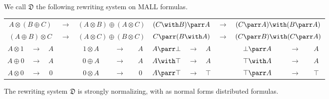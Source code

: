 \documentclass{lmcs}
\newcommand*{\tens}{\otimes} %
\newcommand*{\distsystem}{\mathfrak{D}}
\begin{document}
\begin{defi}
\label{def:distsystem}
We call $\distsystem$ the following rewriting system on MALL formulas.
\begin{center}
\begin{tabular}{cccc|cccc|cccc|cccc}
\multicolumn{3}{c}{$A\tens(B\oplus C)$} & \multicolumn{2}{c}{$\rightarrow$} & \multicolumn{3}{c|}{$(A\tens B)\oplus(A\tens C)$} & \multicolumn{3}{c}{$(C\with B)\parr A$} & \multicolumn{2}{c}{$\rightarrow$} & \multicolumn{3}{c}{$(C\parr A)\with(B\parr A)$} \\
\multicolumn{3}{c}{$(A\oplus B)\tens C$} & \multicolumn{2}{c}{$\rightarrow$} & \multicolumn{3}{c|}{$(A\tens C)\oplus(B\tens C)$} & \multicolumn{3}{c}{$C\parr(B\with A)$} & \multicolumn{2}{c}{$\rightarrow$} & \multicolumn{3}{c}{$(C\parr B)\with(C\parr A)$} \\\hline
$A\tens 1$ & $\rightarrow$ & $A$ & & & $1\tens A$ & $\rightarrow$ & $A$ & $A\parr\bot$ & $\rightarrow$ & $A$ & & & $\bot\parr A$ & $\rightarrow$ & $A$ \\
$A\oplus 0$ & $\rightarrow$ & $A$ & & & $0\oplus A$ & $\rightarrow$ & $A$ & $A\with\top$ & $\rightarrow$ & $A$ & & & $\top\with A$ & $\rightarrow$ & $A$ \\
$A\tens 0$ & $\rightarrow$ & $0$ & & & $0\tens A$ & $\rightarrow$ & $0$ & $A\parr \top$ & $\rightarrow$ & $\top$ & & & $\top\parr A$ & $\rightarrow$ & $\top$ \\
\end{tabular}
\end{center}
\end{defi}

\begin{fact}
\label{lem:distsystem_sn}
The rewriting system $\distsystem$ is strongly normalizing, with as normal forms distributed formulas.
\end{fact}
\end{document}
